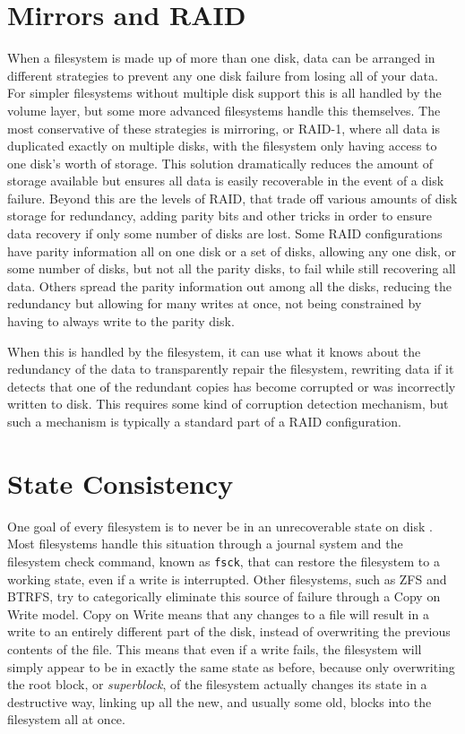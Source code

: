 \section{Mirrors and RAID}
When a filesystem is made up of more than one disk, data can be arranged in different strategies to prevent any one disk
failure from losing all of your data.
For simpler filesystems without multiple disk support this is all handled by the volume layer,
but some more advanced filesystems handle this themselves.
The most conservative of these strategies is mirroring, or RAID-1, where all data is duplicated exactly on multiple disks,
with the filesystem only having access to one disk's worth of storage\cite{patterson_case_1988}.
This solution dramatically reduces the amount of storage available but ensures all data is easily recoverable in
the event of a disk failure.
Beyond this are the levels of RAID, that trade off various amounts of disk storage for redundancy, adding parity bits and other
tricks in order to ensure data recovery if only some number of disks are lost.
Some RAID configurations have parity information all on one disk or a set of disks, 
allowing any one disk, or some number of disks, but not all the parity disks, to fail while still recovering all data.
Others spread the parity information out among all the disks, reducing the redundancy but allowing for many writes at once,
not being constrained by having to always write to the parity disk.

When this is handled by the filesystem, it can use what it knows about the redundancy of the data to transparently repair
the filesystem, rewriting data if it detects that one of the redundant copies has become corrupted or was incorrectly
written to disk.
This requires some kind of corruption detection mechanism, but such a mechanism is typically a standard part of a RAID configuration.

\section{State Consistency}
One goal of every filesystem is to never be in an unrecoverable state on disk
\cite{ahrens_openzfs_basics,mckusick_zfs_2015_presentation}.
Most filesystems handle this situation through a journal system and the filesystem check command, known as \texttt{fsck},
that can restore the filesystem to a working state, even if a write is interrupted.
Other filesystems, such as ZFS and BTRFS, try to categorically eliminate this source of failure through a Copy on Write
model.
Copy on Write means that any changes to a file will result in a write to an entirely different part of the disk, instead of 
overwriting the previous contents of the file.
This means that even if a write fails, the filesystem will simply appear to be in exactly the same state as before, because
only overwriting the root block, or \textit{superblock}, of the filesystem actually changes its state in a destructive way, 
linking up all the new, and usually some old, blocks into the filesystem all at once.

